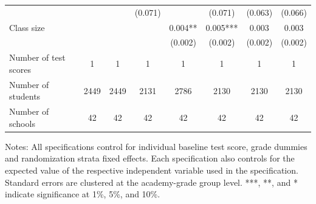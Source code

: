 \begin{center}
\begin{scriptsize}
\begin{threeparttable}
\begin{tabular} {@{} l l c c c c c c c  @{}}
                 &  &  &  & (0.071) &  & (0.071) & (0.063) & (0.066) \\
Class size &  &  &  &  & 0.004** & 0.005*** & 0.003 & 0.003 \\
                 &  &  &  &  & (0.002) & (0.002) & (0.002) & (0.002) \\
\midrule
Number of test scores &  & 1 & 1 & 1 & 1 & 1 & 1 & 1 \\
Number of students &  & 2449 & 2449 & 2131 & 2786 & 2130 & 2130 & 2130 \\
Number of schools &  & 42 & 42 & 42 & 42 & 42 & 42 & 42 \\
\bottomrule
\end{tabular}
\begin{tablenotes}
\item Notes: All specifications control for individual baseline test score, grade dummies and randomization strata fixed effects. Each specification also controls for the expected value of the respective independent variable used in the specification. Standard errors are clustered at the academy-grade group level. ***, **, and * indicate significance at 1\%, 5\%, and 10\%.\end{tablenotes}
\end{threeparttable}
\end{scriptsize}
\end{center}
\clearpage
